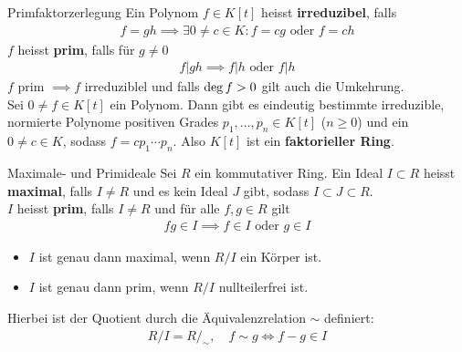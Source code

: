 \begin{satz}{Primfaktorzerlegung}
    Ein Polynom $f \in K[t]$ heisst \textbf{irreduzibel}, falls 
    \begin{align*}
        f = gh \implies \exists 0 \neq c \in K: f = cg \text{ oder } f = ch
    \end{align*}
    $f$ heisst \textbf{prim}, falls für $g \neq 0$ 
    \begin{align*}
        f| gh \implies f|h \text{ oder } f|h
    \end{align*}
    $f$ prim $\implies f$ irreduziblel und falls $\operatorname{deg} f > 0$ gilt auch die Umkehrung.\\
    Sei $0 \neq f \in K[t]$ ein Polynom. Dann gibt es eindeutig bestimmte irreduzible, normierte Polynome positiven Grades $p_1, \ldots, p_n \in K[t]$ ($n \geq 0$) und ein $0 \neq c \in K$, sodass $f = c p_1 \cdots p_n$. Also $K[t]$ ist ein \textbf{faktorieller Ring}.
\end{satz}

\begin{lemma}{Maximale- und Primideale}
    Sei $R$ ein kommutativer Ring. Ein Ideal $I \subset R$ heisst \textbf{maximal}, falls $I \neq R$ und es kein Ideal $J$ gibt, sodass $I \subset J \subset R$.\\
    $I$ heisst \textbf{prim}, falls $I \neq R$ und für alle $f,g \in R$ gilt 
    \begin{align*}
        fg \in I \implies f \in I \text{ oder } g \in I
    \end{align*}
    \begin{itemize}
        \item   $I$ ist genau dann maximal, wenn $R/I$ ein Körper ist.
        \item   $I$ ist genau dann prim, wenn $R/I$ nullteilerfrei ist.
    \end{itemize}
    Hierbei ist der Quotient durch die Äquivalenzrelation $\sim$ definiert:
    \begin{align*}
        R/I = R/_{\sim}, \quad f \sim g \Leftrightarrow f - g \in I
    \end{align*}
\end{lemma}

